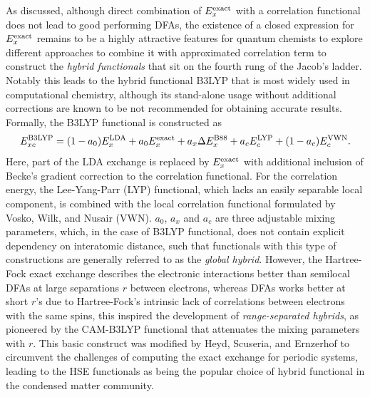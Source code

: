 As discussed, although direct combination of $E_{x}^{\mbox{\scriptsize{exact}}}$  with a correlation functional does not lead to good performing DFAs, the existence of a closed expression for $E_{x}^{\mbox{\scriptsize{exact}}}$ remains to be a highly attractive features for quantum chemists to explore different approaches to combine it with approximated correlation term to construct the \emph{hybrid functionals} that sit on the fourth rung of the Jacob's ladder. Notably this leads to the  hybrid functional B3LYP\cite{10.1063/1.464913,lee1988development,vosko1980accurate,stephens1994ab} that is most widely used in computational chemistry, although its stand-alone usage without  additional corrections are known to be not recommended for obtaining accurate results.\cite{kruse2012standard} Formally, the B3LYP functional is constructed\cite{stephens1994ab} as
\begin{equation}\label{eq:b3lyp_func}
    E_{xc}^{\mbox{\scriptsize{B3LYP}}}=(1-a_0)E_{x}^{\mbox{\scriptsize{LDA}}}+a_0 E_{x}^{\mbox{\scriptsize{exact}}}+a_x \Delta E_{x}^{\mbox{\scriptsize{B88}}}
    +a_c E_{c}^{\mbox{\scriptsize{LYP}}}+(1-a_c)E_{c}^{\mbox{\scriptsize{VWN}}}.
\end{equation}
Here, part of the LDA exchange is replaced by $E_{x}^{\mbox{\scriptsize{exact}}}$  with additional inclusion of Becke's gradient correction\cite{becke1988density} to the correlation functional. For the correlation energy, the Lee-Yang-Parr (LYP)\cite{lee1988development} functional, which lacks  an easily
separable local component, is combined with the local correlation
functional formulated by Vosko, Wilk, and Nusair (VWN).\cite{vosko1980accurate} $a_0$, $a_x$ and $a_c$ are three adjustable mixing parameters, which, in the case of B3LYP functional, does not contain explicit dependency on interatomic distance, such that functionals with this type of constructions are generally referred to as the \emph{global hybrid}. However, the Hartree-Fock exact exchange  describes the electronic interactions better than semilocal DFAs at large separations $r$ between electrons, whereas DFAs works better at short $r$'s due to Hartree-Fock's intrinsic lack of correlations between electrons with the same spins, this inspired the development of \emph{range-separated hybrids}, as pioneered by the CAM-B3LYP\cite{yanai2004new} functional that attenuates the mixing parameters with $r$. This  basic construct was modified by Heyd, Scuseria, and
Ernzerhof to circumvent the challenges of computing the exact exchange for periodic systems, leading to the HSE functionals\cite{heyd2003hybrid} as being the popular choice of hybrid functional in the condensed matter community.


